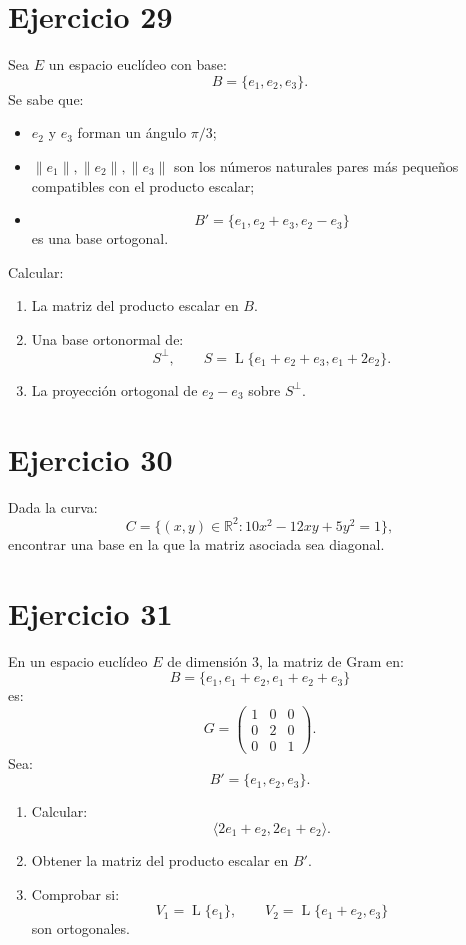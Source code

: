 \documentclass[11pt,a4paper]{article}
\newcommand{\R}{\mathbb{R}}
\newcommand{\Span}{\operatorname{L}}
\begin{document}
\section{Ejercicio 29}
Sea $E$ un espacio euclídeo con base:
\[
B=\{e_1,e_2,e_3\}.
\]
Se sabe que:
\begin{itemize}
\item $e_2$ y $e_3$ forman un ángulo $\pi/3$;
\item $\|e_1\|,\|e_2\|,\|e_3\|$ son los números naturales pares más pequeños compatibles con el producto escalar;
\item
\[
B'=\{e_1,e_2+e_3,e_2-e_3\}
\]
es una base ortogonal.
\end{itemize}
Calcular:
\begin{enumerate}[label=\alph*)]
\item La matriz del producto escalar en $B$.
\item Una base ortonormal de:
\[
S^\perp,
\qquad
S=\Span\{e_1+e_2+e_3,e_1+2e_2\}.
\]
\item La proyección ortogonal de $e_2-e_3$ sobre $S^\perp$.
\end{enumerate}

\section{Ejercicio 30}
Dada la curva:
\[
C=
\{(x,y)\in\R^2:
10x^2-12xy+5y^2=1\},
\]
encontrar una base en la que la matriz asociada sea diagonal.

\section{Ejercicio 31}
En un espacio euclídeo $E$ de dimensión $3$, la matriz de Gram en:
\[
B=\{e_1,e_1+e_2,e_1+e_2+e_3\}
\]
es:
\[
G=
\begin{pmatrix}
1&0&0\\
0&2&0\\
0&0&1
\end{pmatrix}.
\]
Sea:
\[
B'=\{e_1,e_2,e_3\}.
\]
\begin{enumerate}[label=\alph*)]
\item Calcular:
\[
\langle2e_1+e_2,2e_1+e_2\rangle.
\]
\item Obtener la matriz del producto escalar en $B'$.
\item Comprobar si:
\[
V_1=\Span\{e_1\},
\qquad
V_2=\Span\{e_1+e_2,e_3\}
\]
son ortogonales.
\end{enumerate}
\end{document}
